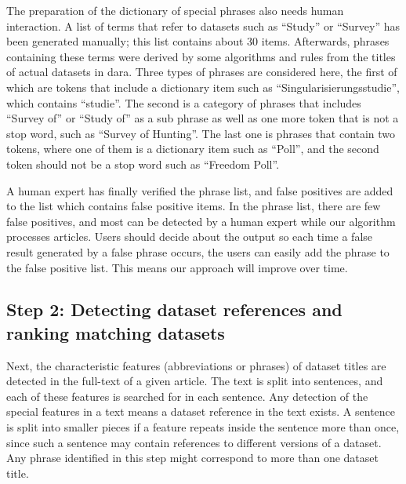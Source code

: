 \documentclass{IOS-Book-Article}
\newcommand{\dara}{\textsf{da\textbar ra}}
\begin{document}
The preparation of the dictionary of special phrases also needs human interaction.
A list of terms that refer to datasets such as \enquote{Study} or \enquote{Survey} has been generated manually; this list contains about 30 items.
Afterwards, phrases containing these terms were derived by some algorithms and rules from the titles of actual datasets in {\dara}.
Three types of phrases are considered here, the first of which are tokens that include a dictionary item such as \enquote{Singularisierungsstudie}, which contains \enquote{studie}.
The second is a category of phrases that includes \enquote{Survey of} or \enquote{Study of} as a sub phrase as well as one more token that is not a stop word, such as \enquote{Survey of Hunting}.
The last one is phrases that contain two tokens, where one of them is a dictionary item such as \enquote{Poll}, and the second token should not be a stop word such as \enquote{Freedom Poll}. 

A human expert has finally verified the phrase list, and false positives are added to the list which contains false positive items.
In the phrase list, there are few false positives, and most can be detected by a human expert 
while our algorithm processes articles.
Users should decide about the output so each time a false result generated by a false phrase occurs, the users can easily add the phrase to the false positive list. This means our approach will improve over time.
 
\subsection{Step 2: Detecting dataset references and ranking matching datasets}
\label{sec:detecting-ranking}
Next, the characteristic features (abbreviations or phrases) of dataset titles are detected in the full-text of a given article.
The text is split into sentences, and each of these features is searched for in each sentence. 
Any detection of the special features in a text means a dataset reference in the text exists.
A sentence is split into smaller pieces if a feature repeats inside the sentence more than once, since such a sentence may contain references to
different versions of a dataset.
Any phrase identified in this step might correspond to more than one dataset title.
\end{document}

